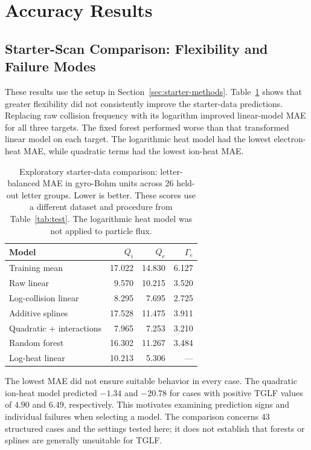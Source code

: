 \documentclass[12pt,letterpaper]{article}
\begin{document}
\section{Accuracy Results}
\label{sec:accuracy-results}
\subsection{Starter-Scan Comparison: Flexibility and Failure Modes}
\label{sec:starter-results}

These results use the setup in Section~\ref{sec:starter-methods}.
Table~\ref{tab:starter} shows that greater flexibility did not consistently
improve the starter-data predictions. Replacing raw collision frequency with
its logarithm improved linear-model MAE for all three targets. The fixed
forest performed worse than that transformed linear model on each target.
The logarithmic heat model had the lowest electron-heat MAE, while quadratic
terms had the lowest ion-heat MAE.

\begin{table}[htbp]
  \centering
  \caption{Exploratory starter-data comparison: letter-balanced MAE in
    gyro-Bohm units across 26 held-out letter groups. Lower is better.
    These scores use a different dataset and procedure from Table~\ref{tab:test}.
    The logarithmic heat model was not applied to particle flux.}
  \label{tab:starter}
  \small
  \begin{tabular}{lrrr}
    \toprule
    Model                    & $Q_i$  & $Q_e$  & $\Gamma_e$ \\
    \midrule
    Training mean            & 17.022 & 14.830 & 6.127      \\
    Raw linear               & 9.570  & 10.215 & 3.520      \\
    Log-collision linear     & 8.295  & 7.695  & 2.725      \\
    Additive splines         & 17.528 & 11.475 & 3.911      \\
    Quadratic + interactions & 7.965  & 7.253  & 3.210      \\
    Random forest            & 16.302 & 11.267 & 3.484      \\
    Log-heat linear          & 10.213 & 5.306  & ---        \\
    \bottomrule
  \end{tabular}
\end{table}

The lowest MAE did not ensure suitable behavior in every case. The quadratic
ion-heat model predicted $-1.34$ and $-20.78$ for cases with positive TGLF
values of $4.90$ and $6.49$, respectively. This motivates examining prediction
signs and individual failures when selecting a model. The comparison concerns
43 structured cases and the settings tested here; it does not establish that
forests or splines are generally unsuitable for TGLF.
\end{document}
